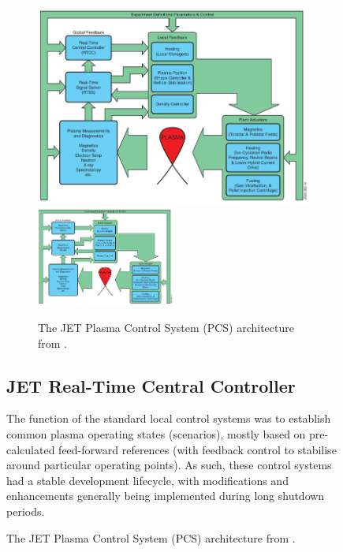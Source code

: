 \documentclass[preprint]{elsarticle}
\begin{document}
\ifpreprint
\begin{figure}[!p]
\else
\begin{figure}[ht!]
\fi

\centering

\ifpreprint
\includegraphics[width=1.0\textwidth]{JG_Felton.PNG}
\else
\includegraphics[width=0.5\textwidth]{JG_Felton.PNG}
\fi
\caption{The JET Plasma Control System (PCS) architecture from \cite{feltonRealtimeMeasurementControl2005b}.}
\label{fig:pcs}
\end{figure}

\subsection{JET Real-Time Central Controller}
\label{s_rtcc}

The function of the standard local control systems was to establish 
common plasma operating states (scenarios), mostly based on 
pre-calculated feed-forward references (with feedback control to stabilise
around particular operating points).  As such, these control systems
had a stable development lifecycle, with modifications and enhancements
generally being implemented during long shutdown periods.


\end{figure}
\end{document}
